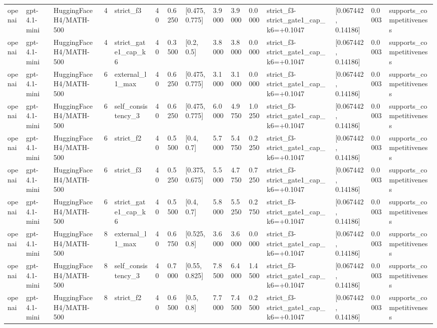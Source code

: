 \begin{tabular}{lllllllllllllll}
openai & gpt-4.1-mini & HuggingFaceH4/MATH-500 & 4 & strict\_f3 & 40 & 0.6250 & [0.475, 0.775] & 3.9000 & 3.9000 & 0.0000 & strict\_f3-strict\_gate1\_cap\_k6=+0.1047 & [0.067442, 0.14186] & 0.0003 & supports\_competitiveness \\
openai & gpt-4.1-mini & HuggingFaceH4/MATH-500 & 4 & strict\_gate1\_cap\_k6 & 40 & 0.3500 & [0.2, 0.5] & 3.8000 & 3.8000 & 0.0000 & strict\_f3-strict\_gate1\_cap\_k6=+0.1047 & [0.067442, 0.14186] & 0.0003 & supports\_competitiveness \\
openai & gpt-4.1-mini & HuggingFaceH4/MATH-500 & 6 & external\_l1\_max & 40 & 0.6250 & [0.475, 0.775] & 3.1000 & 3.1000 & 0.0000 & strict\_f3-strict\_gate1\_cap\_k6=+0.1047 & [0.067442, 0.14186] & 0.0003 & supports\_competitiveness \\
openai & gpt-4.1-mini & HuggingFaceH4/MATH-500 & 6 & self\_consistency\_3 & 40 & 0.6250 & [0.475, 0.775] & 6.0000 & 4.9750 & 1.0250 & strict\_f3-strict\_gate1\_cap\_k6=+0.1047 & [0.067442, 0.14186] & 0.0003 & supports\_competitiveness \\
openai & gpt-4.1-mini & HuggingFaceH4/MATH-500 & 6 & strict\_f2 & 40 & 0.5500 & [0.4, 0.7] & 5.7000 & 5.4750 & 0.2250 & strict\_f3-strict\_gate1\_cap\_k6=+0.1047 & [0.067442, 0.14186] & 0.0003 & supports\_competitiveness \\
openai & gpt-4.1-mini & HuggingFaceH4/MATH-500 & 6 & strict\_f3 & 40 & 0.5250 & [0.375, 0.675] & 5.5000 & 4.7750 & 0.7250 & strict\_f3-strict\_gate1\_cap\_k6=+0.1047 & [0.067442, 0.14186] & 0.0003 & supports\_competitiveness \\
openai & gpt-4.1-mini & HuggingFaceH4/MATH-500 & 6 & strict\_gate1\_cap\_k6 & 40 & 0.5500 & [0.4, 0.7] & 5.8000 & 5.5250 & 0.2750 & strict\_f3-strict\_gate1\_cap\_k6=+0.1047 & [0.067442, 0.14186] & 0.0003 & supports\_competitiveness \\
openai & gpt-4.1-mini & HuggingFaceH4/MATH-500 & 8 & external\_l1\_max & 40 & 0.6750 & [0.525, 0.8] & 3.6000 & 3.6000 & 0.0000 & strict\_f3-strict\_gate1\_cap\_k6=+0.1047 & [0.067442, 0.14186] & 0.0003 & supports\_competitiveness \\
openai & gpt-4.1-mini & HuggingFaceH4/MATH-500 & 8 & self\_consistency\_3 & 40 & 0.7000 & [0.55, 0.825] & 7.8500 & 6.4000 & 1.4500 & strict\_f3-strict\_gate1\_cap\_k6=+0.1047 & [0.067442, 0.14186] & 0.0003 & supports\_competitiveness \\
openai & gpt-4.1-mini & HuggingFaceH4/MATH-500 & 8 & strict\_f2 & 40 & 0.6500 & [0.5, 0.8] & 7.7000 & 7.4500 & 0.2500 & strict\_f3-strict\_gate1\_cap\_k6=+0.1047 & [0.067442, 0.14186] & 0.0003 & supports\_competitiveness \\

\end{tabular}
